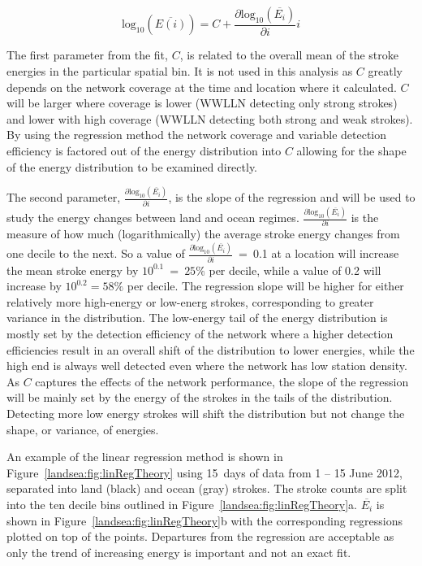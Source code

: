 \begin{equation}
\text{log}_{10}(\overline{E(i)}) = C + \frac{\partial \text{log}_{10}(\overline{E_i})}{\partial i} i
\end{equation}

The first parameter from the fit, $C$, is related to the overall mean of the stroke energies in the particular spatial bin.
It is not used in this analysis as $C$ greatly depends on the network coverage at the time and location where it calculated.
$C$ will be larger where coverage is lower (WWLLN detecting only strong strokes) and lower with high coverage (WWLLN detecting both strong and weak strokes).
By using the regression method the network coverage and variable detection efficiency is factored out of the energy distribution into $C$ allowing for the shape of the energy distribution to be examined directly.

The second parameter, $\frac{\partial \text{log}_{10}(\overline{E_i})}{\partial i}$, is the slope of the regression and will be used to study the energy changes between land and ocean regimes.
$\frac{\partial \text{log}_{10}(\overline{E_i})}{\partial i}$ is the measure of how much (logarithmically) the average stroke energy changes from one decile to the next.
So a value of $\frac{\partial \text{log}_{10}(\overline{E_i})}{\partial i}$~=~0.1 at a location will increase the mean stroke energy by $10^{0.1}~=~25\%$ per decile, while a value of 0.2 will increase by $10^{0.2} = 58\%$ per decile.
The regression slope will be higher for either relatively more high-energy or low-energ strokes, corresponding to greater variance in the distribution.
The low-energy tail of the energy distribution is mostly set by the detection efficiency of the network where a higher detection efficiencies result in an overall shift of the distribution to lower energies, while the high end is always well detected even where the network has low station density.
As $C$ captures the effects of the network performance, the slope of the regression will be mainly set by the energy of the strokes in the tails of the distribution.
Detecting more low energy strokes will shift the distribution but not change the shape, or variance, of energies.

An example of the linear regression method is shown in Figure~\ref{landsea:fig:linRegTheory} using 15~days of data from 1 -- 15 June 2012, separated into land (black) and ocean (gray) strokes.
The stroke counts are split into the ten decile bins outlined in Figure~\ref{landsea:fig:linRegTheory}a.
$\overline{E_i}$ is shown in Figure~\ref{landsea:fig:linRegTheory}b with the corresponding regressions plotted on top of the points.
Departures from the regression are acceptable as only the trend of increasing energy is important and not an exact fit.

